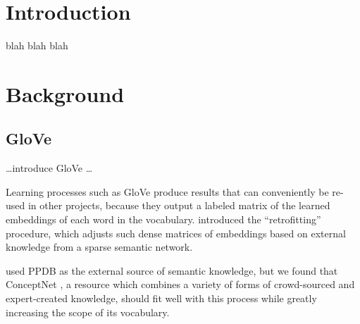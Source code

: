 \documentclass[letterpaper]{article}
\title{\thetitle}
\begin{document}
\maketitle
\begin{abstract}
Embeddings of natural-language words in a vector space are useful for a variety
of tasks in semantics. Embeddings learned from unstructured text can be
combined with structured knowledge to achieve performance that neither source
would achieve on its own, as shown by \citeauthor{faruqui2014retrofitting}
. In this paper, we show the effectiveness
of combining the GloVe embeddings \cite{pennington2014glove} with the
crowd-sourced semantic network ConceptNet \cite{speer2012conceptnet}, with
some changes to the GloVe embeddings and \citeauthor{faruqui2014retrofitting}'s
``retrofitting'' algorithm. The resulting vector space has a larger vocabulary
than either source, and achieves state-of-the-art performance on multiple word
similarity evaluations, including an unprecedented score of $\rho = \scoreRW{}$
on \citeauthor{luong2013rw}'s rare words evaluation.
\end{abstract}

\section{Introduction}
blah blah blah

\section{Background}

\subsection{GloVe}
\ldots introduce GloVe \ldots %

Learning processes such as GloVe produce results that can conveniently be
re-used in other projects, because they output a labeled matrix of the learned
embeddings of each word in the vocabulary.
\citeauthor{faruqui2014retrofitting} 
introduced the ``retrofitting'' procedure, which adjusts such dense matrices of
embeddings based on external knowledge from a sparse semantic network.

\citeauthor{faruqui2014retrofitting} used PPDB \cite{ganitkevitch2013ppdb} as
the external source of semantic knowledge, but we found that ConceptNet
\cite{speer2012conceptnet}, a resource which combines a variety of forms of
crowd-sourced and expert-created knowledge, should fit well with this process
while greatly increasing the scope of its vocabulary.
\end{document}
